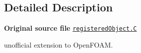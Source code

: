 \subsection{Detailed Description}
{\bfseries Original source file} \href{../../../home/carlo/data/GeN-Foam/GeN-Foam_ffn/GeN-Foam/GeN-Foam/FMU4FOAM/ECI4FOAM/src/externalComm/dataInterface/registeredObject.C}{\tt registered\+Object.\+C}

\begin{DoxyVerb}unofficial extension to OpenFOAM.\end{DoxyVerb}
